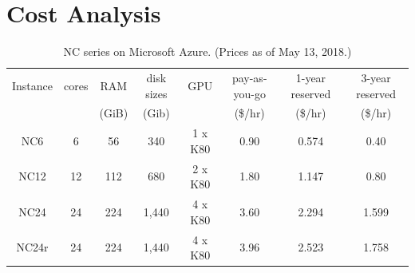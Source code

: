 \documentclass[10pt,journal,compsoc]{IEEEtran}
\begin{document}
\section{Cost Analysis}\label{sec:cost}

\begin{table}[!h]
    \caption{NC series on Microsoft Azure. (Prices as of May 13, 2018.)}
    \label{tab:nc_series}
    \centering
    \begin{tabular}{cccccccc}
        Instance & cores & RAM & disk sizes & GPU & pay-as-you-go & 1-year reserved & 3-year reserved \\
        && (GiB) & (Gib) && (\$/hr) & (\$/hr) & (\$/hr) \\
        \hline
        NC6 & 6 & 56 & 340 & 1 x K80 & 0.90 & 0.574 & 0.40 \\
        NC12 & 12 & 112 & 680 & 2 x K80 & 1.80 & 1.147 & 0.80 \\
        NC24 & 24 & 224 & 1,440 & 4 x K80 & 3.60 & 2.294 & 1.599 \\
        NC24r\footnotemark & 24 & 224 & 1,440 & 4 x K80 & 3.96 & 2.523 & 1.758 \\
        \hline
    \end{tabular}
\end{table}




%
\end{document}
